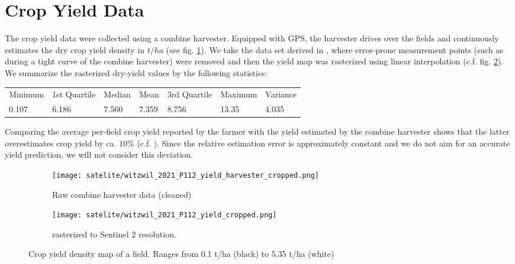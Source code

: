 {{		%
		
		

	}
}

\section{Crop Yield Data}{
	\label{sec:yieldmapping_data}
	The crop yield data were collected using a combine harvester. Equipped with GPS, the harvester drives over the fields and continuously estimates the dry crop yield density in $t/ha$ (see fig. \ref{fig:satelite/witzwil_2021_P112_yield_harvester_cropped}). 
	We take the data set derived in \cite{perichPixelbasedYieldMapping2022a}, where error-prone measurement points (such as during a tight curve of the combine harvester) were removed and then the yield map was rasterized using linear interpolation (c.f. fig. \ref{fig:satelite/witzwil_2021_P112_yield_cropped.png}). We summarize the rasterized dry-yield values by the following statistics:

	\begin{tabular}{l l l l l l l} 
		Minimum & 1st Quartile & Median & Mean  & 3rd Quartile & Maximum & Variance \\
		0.107   & 6.186        & 7.560  & 7.359 & 8.756        & 13.35   & 4.035
	\end{tabular}    

	Comparing the average per-field crop yield reported by the farmer with the yield estimated by the combine harvester shows that the latter overestimates crop yield by ca. $10\%$ (c.f. \cite{perichPixelbasedYieldMapping2022a}). Since the relative estimation error is approximately constant and we do not aim for an accurate yield prediction, we will not consider this deviation. 



	\begin{figure}
		\centering
		\begin{subfigure}{.5\textwidth}
			\centering
			\texttt{[image: satelite/witzwil\_2021\_P112\_yield\_harvester\_cropped.png]}
			\caption{Raw combine harvester data (cleaned)}
			\label{fig:satelite/witzwil_2021_P112_yield_harvester_cropped}
		\end{subfigure}%
		\begin{subfigure}{.5\textwidth}
			\centering
			\texttt{[image: satelite/witzwil\_2021\_P112\_yield\_cropped.png]}
			\caption{rasterized to Sentinel 2 resolution.}
			\label{fig:satelite/witzwil_2021_P112_yield_cropped.png}
		\end{subfigure}
		\caption{Crop yield density map of a field. Ranges from 0.1 t/ha (black) to 5.35 t/ha (white) }
		\label{fig:satelite_witzwil_yield}
	\end{figure}

}



